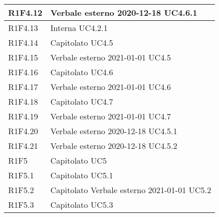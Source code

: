 \begin{center}
\begin{longtable}{|p{22mm}|p{22mm}|}
	\hline
R1F4.12	& 
	Verbale esterno 2020-12-18 \newline	
	UC4.6.1
	\\
	\hline
R1F4.13	& 
	Interna \newline
	UC4.2.1	
	\\

	\hline
R1F4.14	& 
	Capitolato \newline
	UC4.5	
	\\
	\hline
R1F4.15	& 
	Verbale esterno 2021-01-01 \newline
	UC4.5	
	\\

	\hline
R1F4.16	& 
	Capitolato \newline
	UC4.6	
	\\
	\hline
R1F4.17	& 
		Verbale esterno 2021-01-01 \newline
		UC4.6
		\\
	\hline
R1F4.18	& 
	Capitolato \newline	
	UC4.7
	\\
	\hline
R1F4.19	& 
	Verbale esterno 2021-01-01 \newline
	UC4.7	
	\\

	\hline
R1F4.20	& 
	Verbale esterno 2020-12-18 \newline
	UC4.5.1
	\\
	\hline
R1F4.21	& 
	Verbale esterno 2020-12-18 \newline	
	UC4.5.2
	\\
	\hline
R1F5	& 
	Capitolato \newline	
	UC5
	\\
	\hline
R1F5.1	& 
	Capitolato \newline	
	UC5.1
	\\
	\hline
R1F5.2	& 
	Capitolato \newline	
	Verbale esterno 2021-01-01 \newline
	UC5.2
	\\
	\hline
R1F5.3	& 
	Capitolato \newline
	UC5.3	
	\\


\end{longtable}
\end{center}
